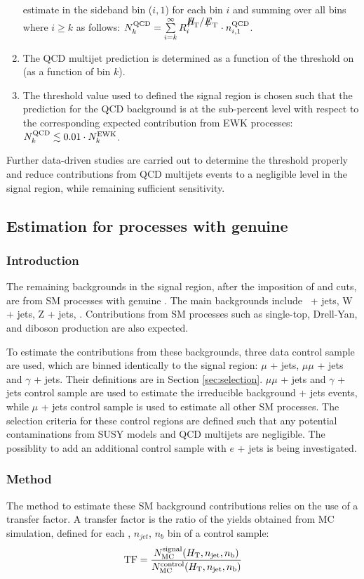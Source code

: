 \begin{enumerate}
  estimate in the \mhtmet sideband bin ($i,1$) for each bin $i$ and
  summing over all bins where $i \geq k$ as follows: $N^{\rm QCD}_{k}
  = \sum\limits^{\infty}_{i=k} R_{i}^{\mhtmet} \cdot n^{\rm
    QCD}_{i,1}$.
\item The QCD multijet prediction is determined as a function of the
  threshold on \alphat (\ie as a function of bin $k$).
\item The \alphat threshold value used to defined the signal region is
  chosen such that the prediction for the QCD background is at the
  sub-percent level with respect to the corresponding expected
  contribution from EWK processes: $N^{\rm QCD}_{k} \lesssim 0.01
  \cdot N^{\rm EWK}_{k}$.
\end{enumerate}

Further data-driven studies are carried out to determine the \alphat threshold properly and reduce contributions from QCD multijets events to a negligible level in the signal region, while remaining sufficient sensitivity.

\subsection{Estimation for processes with genuine \met}
\subsubsection{Introduction}
The remaining backgrounds in the signal region, after the imposition of \alphat and \mhtmet cuts, are from SM processes with genuine \met. The main backgrounds include \znunu\ + jets, W + jets, Z + jets, \ttbar. Contributions from SM processes such as single-top, Drell-Yan, and diboson production are also expected.

To estimate the contributions from these backgrounds, three data control sample are used, which are binned identically to the signal region: $\mu$ + jets, $\mu\mu$ + jets and $\gamma$ + jets. Their definitions are in Section \ref{sec:selection}. $\mu\mu$ + jets and $\gamma$ + jets control sample are used to estimate the irreducible background \znunu + jets events, while $\mu$ + jets control sample is used to estimate all other SM processes. The selection criteria for these control regions are defined such that any potential contaminations from SUSY models and QCD multijets are negligible. The possiblity to add an additional control sample with $e$ + jets is being investigated.


\subsubsection{Method}
\label{sec:ewk-method}
The method to estimate these SM background contributions relies on the use of a transfer factor. A transfer factor is the ratio of the yields obtained from MC simulation, defined for each \scalht, $n_{jet}$, $n_b$ bin of a control sample:
\begin{equation}
  \label{equ:tf-ratio}
  {\rm TF} = \frac{N_{\rm MC}^{\rm signal}(\mbox{$H_\text{T}$},n_{\text{jet}},n_{\text{b}})}{N_{\rm
      MC}^{\rm control}(\mbox{$H_\text{T}$},n_{\text{jet}},n_{\text{b}})} 
\end{equation}

